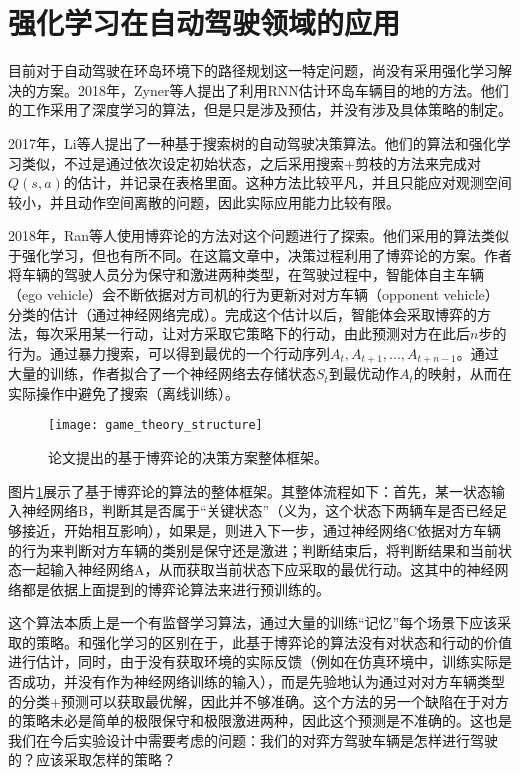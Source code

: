   \section{强化学习在自动驾驶领域的应用}
    目前对于自动驾驶在环岛环境下的路径规划这一特定问题，尚没有采用强化学习解决的方案。2018年，Zyner等人提出了利用RNN估计环岛车辆目的地的方法\cite{RNN_predict_driver_intention}。他们的工作采用了深度学习的算法，但是只是涉及预估，并没有涉及具体策略的制定。\par
    2017年，Li等人提出了一种基于搜索树的自动驾驶决策算法\cite{explicit_decision_tree}。他们的算法和强化学习类似，不过是通过依次设定初始状态，之后采用搜索+剪枝的方法来完成对$Q(s, a)$的估计，并记录在表格里面。这种方法比较平凡，并且只能应对观测空间较小，并且动作空间离散的问题，因此实际应用能力比较有限。\par
    2018年，Ran等人使用博弈论的方法对这个问题进行了探索\cite{game_theory}。他们采用的算法类似于强化学习，但也有所不同。在这篇文章中，决策过程利用了博弈论的方案。作者将车辆的驾驶人员分为保守和激进两种类型，在驾驶过程中，智能体自主车辆（ego vehicle）会不断依据对方司机的行为更新对对方车辆（opponent vehicle）分类的估计（通过神经网络完成）。完成这个估计以后，智能体会采取博弈的方法，每次采用某一行动，让对方采取它策略下的行动，由此预测对方在此后$n$步的行为。通过暴力搜索，可以得到最优的一个行动序列$A_t, A_{t+1}, ..., A_{t+n-1}$。通过大量的训练，作者拟合了一个神经网络去存储状态$S_t$到最优动作$A_t$的映射，从而在实际操作中避免了搜索（离线训练）。
    \begin{figure}[H] %
        \centering
        \texttt{[image: game\_theory\_structure]}
        \caption{论文\cite{game_theory}提出的基于博弈论的决策方案整体框架。}
        \label{fig:game_theory_structure}
    \end{figure}
    \par 图片\ref{fig:game_theory_structure}展示了基于博弈论的算法的整体框架。其整体流程如下：首先，某一状态输入神经网络B，判断其是否属于``关键状态''（义为，这个状态下两辆车是否已经足够接近，开始相互影响），如果是，则进入下一步，通过神经网络C依据对方车辆的行为来判断对方车辆的类别是保守还是激进；判断结束后，将判断结果和当前状态一起输入神经网络A，从而获取当前状态下应采取的最优行动。这其中的神经网络都是依据上面提到的博弈论算法来进行预训练的。\par
    这个算法本质上是一个有监督学习算法，通过大量的训练``记忆''每个场景下应该采取的策略。和强化学习的区别在于，此基于博弈论的算法没有对状态和行动的价值进行估计，同时，由于没有获取环境的实际反馈（例如在仿真环境中，训练实际是否成功，并没有作为神经网络训练的输入），而是先验地认为通过对对方车辆类型的分类+预测可以获取最优解，因此并不够准确。这个方法的另一个缺陷在于对方的策略未必是简单的极限保守和极限激进两种，因此这个预测是不准确的。这也是我们在今后实验设计中需要考虑的问题：我们的对弈方驾驶车辆是怎样进行驾驶的？应该采取怎样的策略？\par

